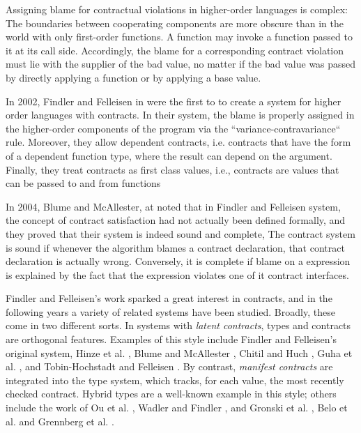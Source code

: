 Assigning blame for contractual violations in higher-order languages
is complex:
%
The boundaries between cooperating components are more obscure 
than in the world with only first-order functions. 
A function may invoke a function passed to it at its call side.
Accordingly, the blame for a corresponding contract violation must 
lie with the supplier of the bad value, 
no matter if the bad value was passed by directly applying 
a function or by applying a base value.
%

In 2002, Findler and Felleisen in \cite{Findler02} were the first to
to create a system for higher order languages with contracts.
%
In their system, the blame is properly assigned in the 
higher-order components of the program via the 
``variance-contravariance`` rule.
Moreover,
they allow dependent contracts, i.e. 
contracts that have the form of a dependent function type, 
where the result can depend on the argument.
Finally,
they treat contracts as first class values, 
i.e., contracts are values that can be passed to and from functions

In 2004, Blume and McAllester, at \cite{BlumeM06} noted that 
in Findler and Felleisen system,
the concept of contract satisfaction had not actually been defined
formally, and they proved that their system is indeed
sound and complete, 
%
The contract system is sound if whenever
the algorithm blames a contract declaration, 
that contract declaration is actually wrong.
%
Conversely, it is complete if blame on a expression is explained
by the fact that the expression violates one of it contract interfaces.

Findler and Felleisen's work sparked a great interest
in contracts, and in the following years a variety
of related systems have been studied. 
Broadly, these come in two different sorts. 
%
In systems with \textit{latent contracts}, types and contracts
are orthogonal features. Examples of this style include Findler
and Felleisen's original system, Hinze et al. \cite{Hinze06}, Blume and
McAllester \cite{BlumeM06}, Chitil and Huch \cite{ChitilH07}, Guha et al. \cite{GuhaMFK07},
and Tobin-Hochstadt and Felleisen \cite{Tobin-HochstadtF08}. 
By contrast, \textit{manifest contracts} are integrated into the type system, 
which tracks, for each value, the most recently checked contract. 
Hybrid types \cite{flanagan06} are a well-known example in this style; others include the
work of Ou et al. \cite{Ou2004}, Wadler and Findler \cite{WadlerF09}, and Gronski
et al. \cite{Gronski06}, Belo et al. \cite{Greenberg11} and Grennberg et al. \cite{Greenberg12}.

